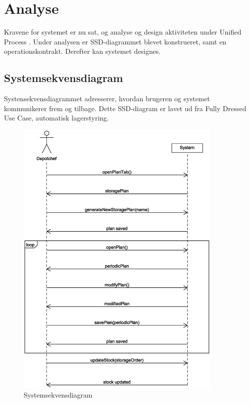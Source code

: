 \chapter{Analyse}\label{ch:analyse}

Kravene for systemet er nu sat, og analyse og design aktiviteten under Unified Process \cite{UnifiedProcess}. Under analysen er SSD-diagrammet blevet konstrueret, samt en operationskontrakt. Derefter kan systemet designes. 

\section{Systemsekvensdiagram}
Systensekvensdiagrammet \cite{Larman2004} adresserer, hvordan brugeren og systemet kommunikerer frem og tilbage. Dette SSD-diagram er lavet ud fra Fully Dressed Use Case, automatisk lagerstyring.

\begin{figure}[H]
    \centering
    \includegraphics[width=100mm]{figures/analyse/SSD.eps}
    \caption{Systemsekvensdiagram}
    \label{fig:ssd}
\end{figure}

